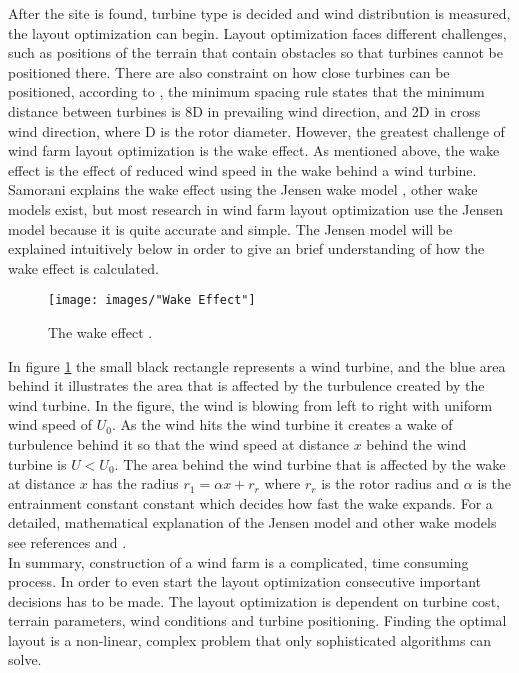 \noindent After the site is found, turbine type is decided and wind distribution is measured, the layout optimization can begin. Layout optimization faces different challenges, such as positions of the terrain that contain obstacles so that turbines cannot be positioned there. There are also constraint on how close turbines can be positioned, according to \cite{Sisbot}, the minimum spacing rule states that the minimum distance between turbines is 8D in prevailing wind direction, and 2D in cross wind direction, where D is the rotor diameter. However, the greatest challenge of wind farm layout optimization is the wake effect. As mentioned above, the wake effect is the effect of reduced wind speed in the wake behind a wind turbine. Samorani explains the wake effect using the Jensen wake model \citep{Jensen}, other wake models exist, but most research in wind farm layout optimization use the Jensen model because it is quite accurate and simple. The Jensen model will be explained intuitively below in order to give an brief understanding of how the wake effect is calculated. \\

\begin{figure}[h!]
\begin{center}
\texttt{[image: images/"Wake Effect"]}
\caption{The wake effect \citep{Samorani}.}
\label{Wake effect}
\end{center}
\end{figure}

\noindent In figure \ref{Wake effect} the small black rectangle represents a wind turbine, and the blue area behind it illustrates the area that is affected by the turbulence created by the wind turbine. In the figure, the wind is blowing from left to right with uniform wind speed of $U_0$. As the wind hits the wind turbine it creates a wake of turbulence behind it so that the wind speed at distance $x$ behind the wind turbine is $U < U_0$. The area behind the wind turbine that is affected by the wake at distance $x$ has the radius $r_1 = \alpha x + r_r$ where $r_r$ is the rotor radius and $\alpha$ is the entrainment constant constant which decides how fast the wake expands. For a detailed, mathematical explanation of the Jensen model and other wake models see references \citep{Jensen} and \citep{Liang}.\\

\noindent In summary, construction of a wind farm is a complicated, time consuming process. In order to even start the layout optimization consecutive important decisions has to be made. The layout optimization is dependent on turbine cost, terrain parameters, wind conditions and turbine positioning. Finding the optimal layout is a non-linear, complex problem that only sophisticated algorithms can solve.



